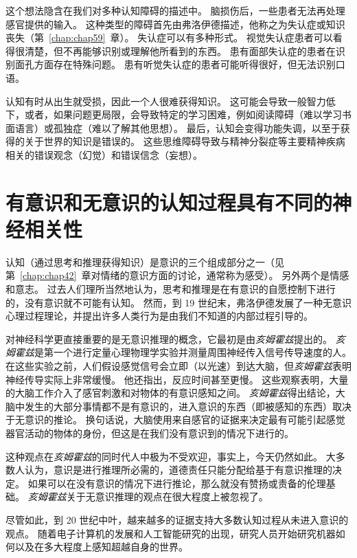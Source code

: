 这个想法隐含在我们对多种认知障碍的描述中。
脑损伤后，一些患者无法再处理感官提供的输入。
这种类型的障碍首先由弗洛伊德描述，他称之为失认症或知识丧失（第~\ref{chap:chap59}~章）。
失认症可以有多种形式。
视觉失认症患者可以看得很清楚，但不再能够识别或理解他所看到的东西。
患有面部失认症的患者在识别面孔方面存在特殊问题。
患有听觉失认症的患者可能听得很好，但无法识别口语。


认知有时从出生就受损，因此一个人很难获得知识。
这可能会导致一般智力低下，或者，如果问题更局限，会导致特定的学习困难，例如阅读障碍（难以学习书面语言）或孤独症（难以了解其他思想）。
最后，认知会变得功能失调，以至于获得的关于世界的知识是错误的。
这些思维障碍导致与精神分裂症等主要精神疾病相关的错误观念（幻觉）和错误信念（妄想）。



\section{有意识和无意识的认知过程具有不同的神经相关性}

认知（通过思考和推理获得知识）是意识的三个组成部分之一（见第~\ref{chap:chap42}~章对情绪的意识方面的讨论，通常称为感受）。
另外两个是情感和意志。
过去人们理所当然地认为，思考和推理是在有意识的自愿控制下进行的，没有意识就不可能有认知。
然而，到 19 世纪末，弗洛伊德发展了一种无意识心理过程理论，并提出许多人类行为是由我们不知道的内部过程引导的。


对神经科学更直接重要的是无意识推理的概念，它最初是由\textit{亥姆霍兹}提出的。
\textit{亥姆霍兹}是第一个进行定量心理物理学实验并测量周围神经传入信号传导速度的人。
在这些实验之前，人们假设感觉信号会立即（以光速）到达大脑，但\textit{亥姆霍兹}表明神经传导实际上非常缓慢。
他还指出，反应时间甚至更慢。
这些观察表明，大量的大脑工作介入了感官刺激和对物体的有意识感知之间。
\textit{亥姆霍兹}得出结论，大脑中发生的大部分事情都不是有意识的，进入意识的东西（即被感知的东西）取决于无意识的推论。
换句话说，大脑使用来自感官的证据来决定最有可能引起感觉器官活动的物体的身份，但这是在我们没有意识到的情况下进行的。


这种观点在\textit{亥姆霍兹}的同时代人中极为不受欢迎，事实上，今天仍然如此。
大多数人认为，意识是进行推理所必需的，道德责任只能分配给基于有意识推理的决定。
如果可以在没有意识的情况下进行推论，那么就没有赞扬或责备的伦理基础。
\textit{亥姆霍兹}关于无意识推理的观点在很大程度上被忽视了。


尽管如此，到 20 世纪中叶，越来越多的证据支持大多数认知过程从未进入意识的观点。
随着电子计算机的发展和人工智能研究的出现，研究人员开始研究机器如何以及在多大程度上感知超越自身的世界。


